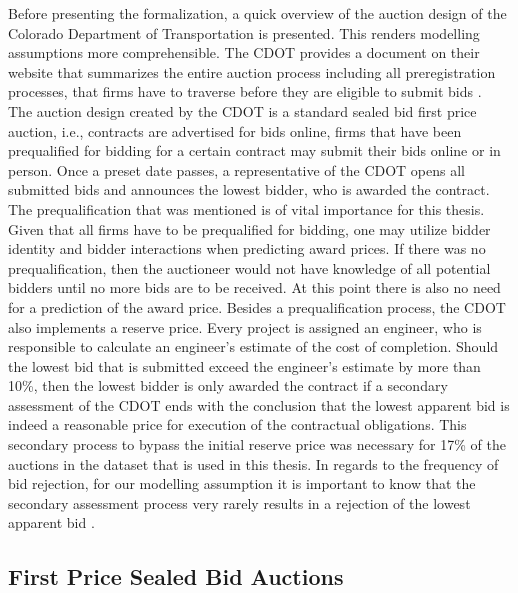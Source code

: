\documentclass[a4paper,12pt, headsepline]{scrartcl}
\numberwithin{equation}{section}
\begin{document}
Before presenting the formalization, a quick overview of the auction design of the Colorado Department of Transportation is presented. This renders modelling assumptions more comprehensible. The CDOT provides a document on their website that summarizes the entire auction process including all preregistration processes, that firms have to traverse before they are eligible to submit bids \citep{CDOTRul}.\\
The auction design created by the CDOT is a standard sealed bid first price auction, i.e., contracts are advertised for bids online, firms that have been prequalified for bidding for a certain contract may submit their bids online or in person. Once a preset date passes, a representative of the CDOT opens all submitted bids and announces the lowest bidder, who is awarded the contract. The prequalification that was mentioned is of vital importance for this thesis. Given that all firms have to be prequalified for bidding, one may utilize bidder identity and bidder interactions when predicting award prices. If there was no prequalification, then the auctioneer would not have knowledge of all potential bidders until no more bids are to be received. At this point there is also no need for a prediction of the award price. Besides a prequalification process, the CDOT also implements a reserve price. Every project is assigned an engineer, who is responsible to calculate an engineer's estimate of the cost of completion. Should the lowest bid that is submitted exceed the engineer's estimate by more than 10\%, then the lowest bidder is only awarded the contract if a secondary assessment of the CDOT ends with the conclusion that the lowest apparent bid is indeed a reasonable price for execution of the contractual obligations. This secondary process to bypass the initial reserve price was necessary for 17\% of the auctions in the dataset that is used in this thesis. In regards to the frequency of bid rejection, for our modelling assumption it is important to know that the secondary assessment process very rarely results in a rejection of the lowest apparent bid \citep{CDOTRul}. 

\subsection{First Price Sealed Bid Auctions}\label{subsec:fpsba}
\end{document}
